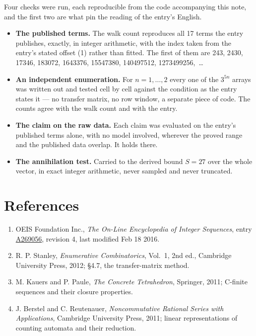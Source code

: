 \documentclass[11pt]{article}
\theoremstyle{definition}
\begin{document}
Four checks were run, each reproducible from the code accompanying this note, and the first two are what pin the reading of the entry's English.

\begin{itemize}

\item {\bfseries The published terms.} The walk count reproduces all 17 terms the entry publishes, exactly, in integer arithmetic, with the index taken from the entry's stated offset (1) rather than fitted. The first of them are 243, 2430, 17346, 183072, 1643376, 15547380, 140497512, 1273499256,~\dots

\item {\bfseries An independent enumeration.} For $n = 1,\dots,2$ every one of the $3^{5n}$ arrays was written out and tested cell by cell against the condition as the entry states it --- no transfer matrix, no row window, a separate piece of code. The counts agree with the walk count and with the entry.

\item {\bfseries The claim on the raw data.} Each claim was evaluated on the entry's published terms alone, with no model involved, wherever the proved range and the published data overlap. It holds there.

\item {\bfseries The annihilation test.} Carried to the derived bound $S = 27$ over the whole vector, in exact integer arithmetic, never sampled and never truncated.

\end{itemize}

\section{References}

\begin{enumerate}

\item OEIS Foundation Inc., \emph{The On-Line Encyclopedia of Integer Sequences}, entry \href{https://oeis.org/A269056}{A269056}, revision 4, last modified Feb 18 2016.

\item R. P. Stanley, \emph{Enumerative Combinatorics}, Vol.~1, 2nd ed., Cambridge University Press, 2012; \S4.7, the transfer-matrix method.

\item M. Kauers and P. Paule, \emph{The Concrete Tetrahedron}, Springer, 2011; C-finite sequences and their closure properties.

\item J. Berstel and C. Reutenauer, \emph{Noncommutative Rational Series with Applications}, Cambridge University Press, 2011; linear representations of counting automata and their reduction.

\end{enumerate}
\end{document}
